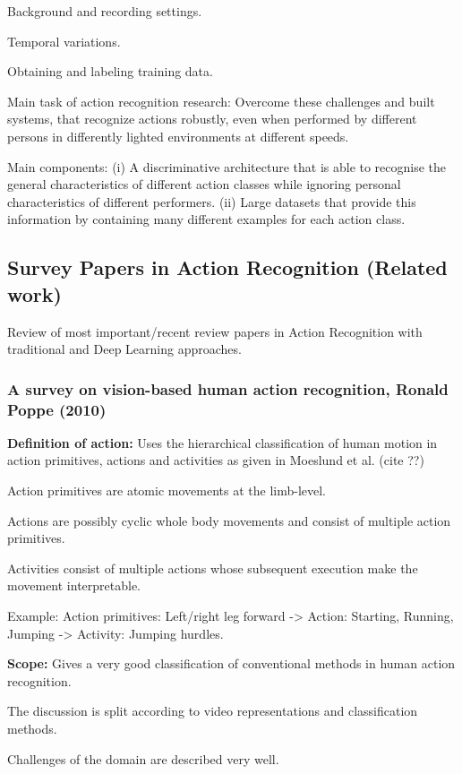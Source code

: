 Background and recording settings.

Temporal variations.

Obtaining and labeling training data.

Main task of action recognition research: Overcome these challenges and built systems, that recognize actions robustly, even when performed by different persons in differently lighted environments at different speeds.

Main components: (i) A discriminative architecture that is able to recognise the general characteristics of different action classes while ignoring personal characteristics of different performers.
(ii) Large datasets that provide this information by containing many different examples for each action class.

\subsection{Survey Papers in Action Recognition (Related work)}

Review of most important/recent review papers in Action Recognition with traditional and Deep Learning approaches.

\subsubsection{A survey on vision-based human action recognition, Ronald Poppe (2010)}

\textbf{Definition of action:} Uses the hierarchical classification of human motion in action primitives, actions and activities as given in Moeslund et al. (cite ??)

Action primitives are atomic movements at the limb-level.

Actions are possibly cyclic whole body movements and consist of multiple action primitives.

Activities consist of multiple actions whose subsequent execution make the movement interpretable.

Example: Action primitives: Left/right leg forward -> Action: Starting, Running, Jumping -> Activity: Jumping hurdles.

\textbf{Scope:} Gives a very good classification of conventional methods in human action recognition.

The discussion is split according to video representations and classification methods.

Challenges of the domain are described very well.

